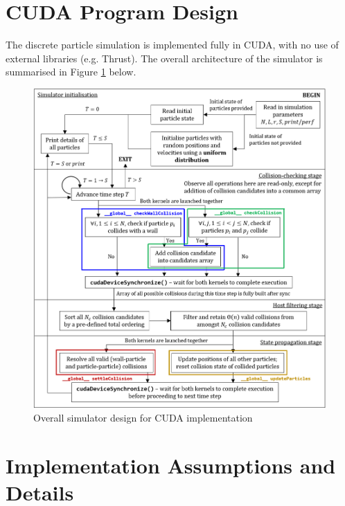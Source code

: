 \documentclass[12pt]{article}
\begin{document}
\maketitle
\setcounter{tocdepth}{1}
\tableofcontents

\pagebreak
\large{}
\section{CUDA Program Design}

The discrete particle simulation is implemented fully in CUDA, with no use of external libraries (e.g. Thrust). The overall architecture of the simulator is summarised in Figure \ref{fig:simulator-design} below.\\

\begin{figure}[H]
    \includegraphics{chap1Flowchart-CUDA}
    \centering
    \caption{Overall simulator design for CUDA implementation}
    \label{fig:simulator-design}
\end{figure}

\pagebreak

\section{Implementation Assumptions and Details}
\end{document}
